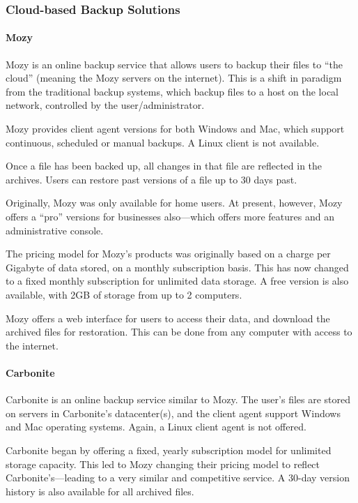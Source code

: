 \begin{bibunit}[plain]
\subsubsection{Cloud-based Backup Solutions}

\paragraph{Mozy}

Mozy is an online backup service that allows users to backup their files to
``the cloud'' (meaning the Mozy servers on the internet). This is a shift in
paradigm from the traditional backup systems, which backup files to a host on
the local network, controlled by the user/administrator.

Mozy provides client agent versions for both Windows and Mac, which support
continuous, scheduled or manual backups. A Linux client is not available.

Once a file has been backed up, all changes in that file are reflected in the
archives. Users can restore past versions of a file up to 30 days past.

Originally, Mozy was only available for home users. At present, however, Mozy
offers a ``pro'' versions for businesses also---which offers more features and
an administrative console.

The pricing model for Mozy's products was originally based on a charge per
Gigabyte of data stored, on a monthly subscription basis. This has now changed
to a fixed monthly subscription for unlimited data storage. A free version is
also available, with 2GB of storage from up to 2 computers.

Mozy offers a web interface for users to access their data, and download the
archived files for restoration. This can be done from any computer with access
to the internet.

\paragraph{Carbonite}

Carbonite is an online backup service similar to Mozy. The user's files are
stored on servers in Carbonite's datacenter(s), and the client agent support
Windows and Mac operating systems. Again, a Linux client agent is not offered.

Carbonite began by offering a fixed, yearly subscription model for unlimited
storage capacity. This led to Mozy changing their pricing model to reflect
Carbonite's---leading to a very similar and competitive service. A 30-day
version history is also available for all archived files.


\end{bibunit}
